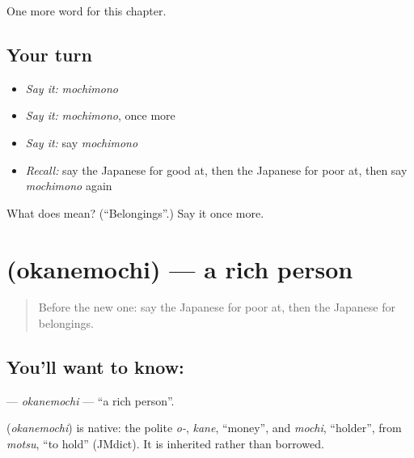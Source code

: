 \begin{grammarlens}[title={What you've built}]
One more word for this chapter.
\end{grammarlens}

\subsection*{Your turn}
\begin{itemize}
\raggedright
  \item \emph{Say it:} \emph{mochimono}
  \item \emph{Say it:} \emph{mochimono}, once more
  \item \emph{Say it:} say \emph{mochimono}
  \item \emph{Recall:} say the Japanese for good at, then the Japanese for poor at, then say \emph{mochimono} again
\end{itemize}

\begin{tcolorbox}[breakable,colback=teal!4,colframe=teal!35!black,title={Before you move on}]
What does  mean? (\textquotedblleft{}Belongings\textquotedblright{}.) Say it once more.
\end{tcolorbox}
\section[\texorpdfstring{\ja{おかねもち} (okanemochi)}{おかねもち (okanemochi)}]{ (okanemochi) — a rich person}

\label{lesson:JA-C95-okanemochi}



\begin{quote}
Before the new one: say the Japanese for poor at, then the Japanese for belongings.
\end{quote}

\subsection*{You'll want to know: }
\textbf{} — \emph{okanemochi} — \textquotedblleft{}a rich person\textquotedblright{}.

\begin{cousinweb}
\textbf{} (\emph{okanemochi}) is native: the polite \emph{o-}, \emph{kane}, \textquotedblleft{}money\textquotedblright{}, and \emph{mochi}, \textquotedblleft{}holder\textquotedblright{}, from \emph{motsu}, \textquotedblleft{}to hold\textquotedblright{} (JMdict). It is inherited rather than borrowed.
\end{cousinweb}

